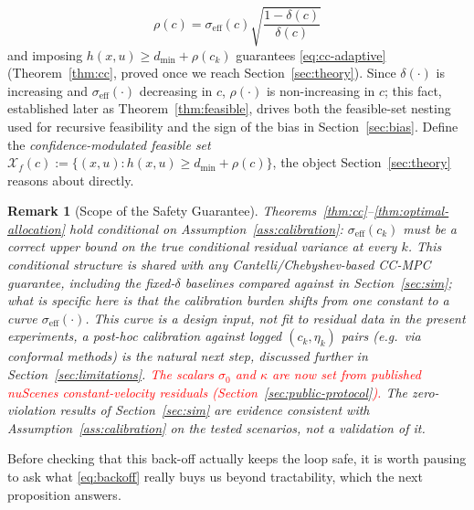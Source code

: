 \documentclass[letterpaper, 10 pt, conference]{ieeeconf}
\newtheorem{remark}{Remark}
\begin{document}
\begin{equation}
\rho(c) = \sigma_{\mathrm{eff}}(c)\sqrt{\dfrac{1-\delta(c)}{\delta(c)}} \label{eq:backoff}
\end{equation}
and imposing $h(x,u)\ge d_{\min}+\rho(c_k)$ guarantees \eqref{eq:cc-adaptive} (Theorem~\ref{thm:cc}, proved once we reach Section~\ref{sec:theory}). Since $\delta(\cdot)$ is increasing and $\sigma_{\mathrm{eff}}(\cdot)$ decreasing in $c$, $\rho(\cdot)$ is non-increasing in $c$; this fact, established later as Theorem~\ref{thm:feasible}, drives both the feasible-set nesting used for recursive feasibility and the sign of the bias in Section~\ref{sec:bias}. Define the \emph{confidence-modulated feasible set} $\mathcal X_f(c) := \{(x,u) : h(x,u) \ge d_{\min}+\rho(c)\}$, the object Section~\ref{sec:theory} reasons about directly.

\begin{remark}[Scope of the Safety Guarantee]
\label{rem:calibration}
Theorems~\ref{thm:cc}--\ref{thm:optimal-allocation} hold conditional on Assumption~\ref{ass:calibration}: $\sigma_{\mathrm{eff}}(c_k)$ must be a correct upper bound on the true conditional residual variance at every $k$. This conditional structure is shared with any Cantelli/Chebyshev-based CC-MPC guarantee, including the fixed-$\delta$ baselines compared against in Section~\ref{sec:sim}; what is specific here is that the calibration burden shifts from one constant to a curve $\sigma_{\mathrm{eff}}(\cdot)$. This curve is a design input, not fit to residual data in the present experiments,  a post-hoc calibration against logged $(c_k,\eta_k)$ pairs (e.g.\ via conformal methods) is the natural next step, discussed further in Section~\ref{sec:limitations}. \textcolor{red}{The scalars $\sigma_0$ and $\kappa$ are now set from published nuScenes constant-velocity residuals (Section~\ref{sec:public-protocol}).} The zero-violation results of Section~\ref{sec:sim} are evidence consistent with Assumption~\ref{ass:calibration} on the tested scenarios, not a validation of it.
\end{remark}

Before checking that this back-off actually keeps the loop safe, it is worth pausing to ask what \eqref{eq:backoff} really buys us beyond tractability, which the next proposition answers.
\end{document}
